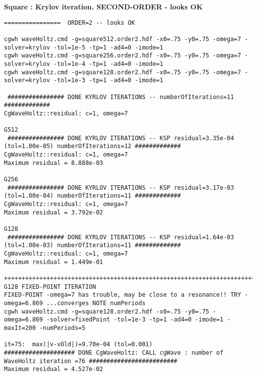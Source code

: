 \bigskip
\textbf{Square  : Krylov iteration. SECOND-ORDER  - looks OK}
\begin{Verbatim}[fontsize=\scriptsize]
================  ORDER=2 -- looks OK 

cgwh waveHoltz.cmd -g=square512.order2.hdf -x0=.75 -y0=.75 -omega=7 -solver=krylov -tol=1e-5 -tp=1 -ad4=0 -imode=1
cgwh waveHoltz.cmd -g=square256.order2.hdf -x0=.75 -y0=.75 -omega=7 -solver=krylov -tol=1e-4 -tp=1 -ad4=0 -imode=1
cgwh waveHoltz.cmd -g=square128.order2.hdf -x0=.75 -y0=.75 -omega=7 -solver=krylov -tol=1e-3 -tp=1 -ad4=0 -imode=1

 ################ DONE KYRLOV ITERATIONS -- numberOfIterations=11 #############
CgWaveHoltz::residual: c=1, omega=7

G512
 ################ DONE KYRLOV ITERATIONS -- KSP residual=3.35e-04 (tol=1.00e-05) numberOfIterations=12 #############
CgWaveHoltz::residual: c=1, omega=7
Maximum residual = 8.888e-03

G256
 ################ DONE KYRLOV ITERATIONS -- KSP residual=3.17e-03 (tol=1.00e-04) numberOfIterations=11 #############
CgWaveHoltz::residual: c=1, omega=7
Maximum residual = 3.792e-02

G128
 ################ DONE KYRLOV ITERATIONS -- KSP residual=1.64e-03 (tol=1.00e-03) numberOfIterations=11 #############
CgWaveHoltz::residual: c=1, omega=7
Maximum residual = 1.449e-01

++++++++++++++++++++++++++++++++++++++++++++++++++++++++++++++++++++++++++++++++++++++++++++++++++++++++++++++++++++++++++++++
G128 FIXED-POINT ITERATION
FIXED-POINT -omega=7 has trouble, may be close to a resonance!! TRY -omega=6.869 ...converges NOTE numPeriods
cgwh waveHoltz.cmd -g=square128.order2.hdf -x0=.75 -y0=.75 -omega=6.869 -solver=fixedPoint -tol=1e-3 -tp=1 -ad4=0 -imode=1 -maxIt=200 -numPeriods=5

it=75:  max(|v-vOld|)=9.70e-04 (tol=0.001)
#################### DONE CgWaveHoltz: CALL cgWave : number of WaveHoltz iteration =76 #########################
Maximum residual = 4.527e-02

\end{Verbatim}


